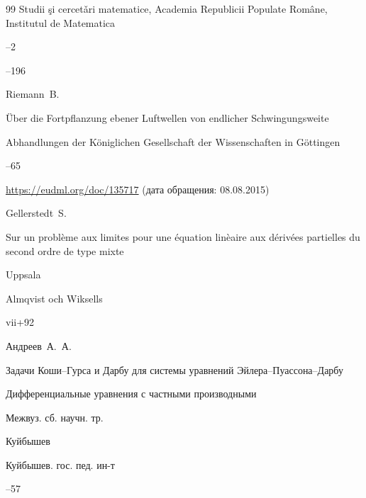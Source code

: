 \begin{thebibliography}{99}
\jour Studii \c{s}i cercet\v{a}ri matematice, Academia Republicii Populate Rom\^{a}ne, Institutul de Matematica



--2

--196





\by  Riemann~B.

\paper \"Uber die Fortpflanzung ebener Luftwellen von endlicher Schwingungsweite

\jour  Abhandlungen der K\"oniglichen Gesellschaft der Wissenschaften in G\"ottingen



--65

\elink \url{https://eudml.org/doc/135717} \Russian (дата обращения: 08.08.2015)








\by   Gellerstedt~S.

\book Sur un probl\`eme aux limites pour une \'equation lin\`eaire aux d\'eriv\'ees partielles du second ordre de type mixte

\publaddr Uppsala

\publ Almqvist och Wiksells 


\totalpages vii+92







\by Андреев~А.~А.

\paper Задачи Коши--Гурса и Дарбу для системы уравнений Эйлера--Пуассона--Дарбу

\inbook Дифференциальные уравнения с частными производными

\bookinfo Межвуз. сб. научн. тр.

\publaddr Куйбышев

\publ Куйбышев. гос. пед. ин-т


--57







\end{thebibliography}
